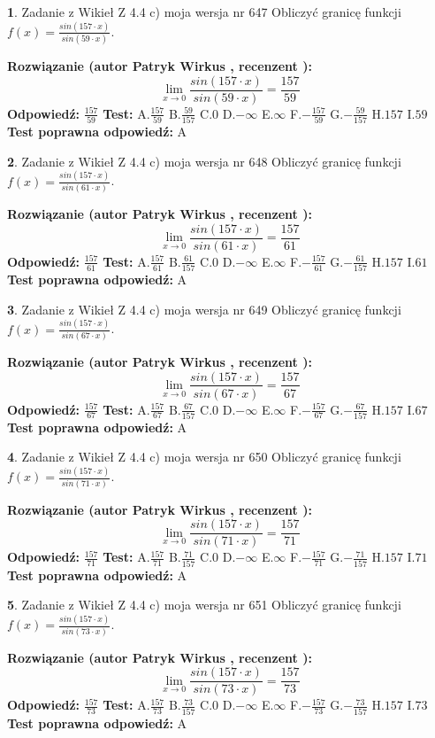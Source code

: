 \documentclass[12pt, a4paper]{article}
\theoremstyle{definition} %
\newtheorem{zad}{}
\newcommand{\zadStart}[1]{\begin{zad}#1\newline}
\newcommand{\zadStop}{\end{zad}}
\newcommand{\rozwStart}[2]{\noindent \textbf{Rozwiązanie (autor #1 , recenzent #2): }\newline}
\newcommand{\rozwStop}{\newline}
\newcommand{\odpStart}{\noindent \textbf{Odpowiedź:}\newline}
\newcommand{\odpStop}{\newline}
\newcommand{\testStart}{\noindent \textbf{Test:}\newline}
\newcommand{\testStop}{\newline}
\newcommand{\kluczStart}{\noindent \textbf{Test poprawna odpowiedź:}\newline}
\newcommand{\kluczStop}{\newline}
\begin{document}
\zadStart{Zadanie z Wikieł Z 4.4 c) moja wersja nr 647}
Obliczyć granicę funkcji $f(x)=\frac{sin(157\cdot x)}{sin(59\cdot x)}$.
\zadStop
\rozwStart{Patryk Wirkus}{}
$$\lim\limits_{x\to 0}\frac{sin(157\cdot x)}{sin(59\cdot x)}=
\frac{157}{59}$$
\rozwStop
\odpStart
$\frac{157}{59}$
\odpStop
\testStart
A.$\frac{157}{59}$
B.$\frac{59}{157}$
C.$0$
D.$-\infty$
E.$\infty$
F.$-\frac{157}{59}$
G.$-\frac{59}{157}$
H.$157$
I.$59$
\testStop
\kluczStart
A
\kluczStop



\zadStart{Zadanie z Wikieł Z 4.4 c) moja wersja nr 648}
Obliczyć granicę funkcji $f(x)=\frac{sin(157\cdot x)}{sin(61\cdot x)}$.
\zadStop
\rozwStart{Patryk Wirkus}{}
$$\lim\limits_{x\to 0}\frac{sin(157\cdot x)}{sin(61\cdot x)}=
\frac{157}{61}$$
\rozwStop
\odpStart
$\frac{157}{61}$
\odpStop
\testStart
A.$\frac{157}{61}$
B.$\frac{61}{157}$
C.$0$
D.$-\infty$
E.$\infty$
F.$-\frac{157}{61}$
G.$-\frac{61}{157}$
H.$157$
I.$61$
\testStop
\kluczStart
A
\kluczStop



\zadStart{Zadanie z Wikieł Z 4.4 c) moja wersja nr 649}
Obliczyć granicę funkcji $f(x)=\frac{sin(157\cdot x)}{sin(67\cdot x)}$.
\zadStop
\rozwStart{Patryk Wirkus}{}
$$\lim\limits_{x\to 0}\frac{sin(157\cdot x)}{sin(67\cdot x)}=
\frac{157}{67}$$
\rozwStop
\odpStart
$\frac{157}{67}$
\odpStop
\testStart
A.$\frac{157}{67}$
B.$\frac{67}{157}$
C.$0$
D.$-\infty$
E.$\infty$
F.$-\frac{157}{67}$
G.$-\frac{67}{157}$
H.$157$
I.$67$
\testStop
\kluczStart
A
\kluczStop



\zadStart{Zadanie z Wikieł Z 4.4 c) moja wersja nr 650}
Obliczyć granicę funkcji $f(x)=\frac{sin(157\cdot x)}{sin(71\cdot x)}$.
\zadStop
\rozwStart{Patryk Wirkus}{}
$$\lim\limits_{x\to 0}\frac{sin(157\cdot x)}{sin(71\cdot x)}=
\frac{157}{71}$$
\rozwStop
\odpStart
$\frac{157}{71}$
\odpStop
\testStart
A.$\frac{157}{71}$
B.$\frac{71}{157}$
C.$0$
D.$-\infty$
E.$\infty$
F.$-\frac{157}{71}$
G.$-\frac{71}{157}$
H.$157$
I.$71$
\testStop
\kluczStart
A
\kluczStop



\zadStart{Zadanie z Wikieł Z 4.4 c) moja wersja nr 651}
Obliczyć granicę funkcji $f(x)=\frac{sin(157\cdot x)}{sin(73\cdot x)}$.
\zadStop
\rozwStart{Patryk Wirkus}{}
$$\lim\limits_{x\to 0}\frac{sin(157\cdot x)}{sin(73\cdot x)}=
\frac{157}{73}$$
\rozwStop
\odpStart
$\frac{157}{73}$
\odpStop
\testStart
A.$\frac{157}{73}$
B.$\frac{73}{157}$
C.$0$
D.$-\infty$
E.$\infty$
F.$-\frac{157}{73}$
G.$-\frac{73}{157}$
H.$157$
I.$73$
\testStop
\kluczStart
A
\kluczStop
\end{document}
